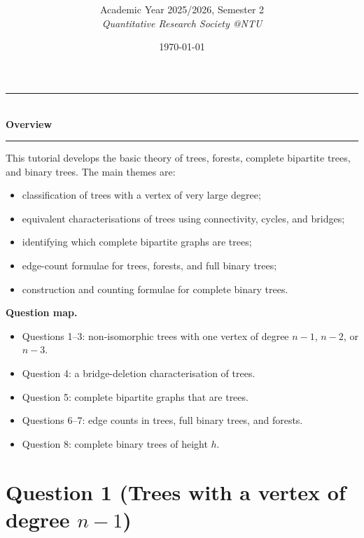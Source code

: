 \documentclass[12pt]{article}
\title{
\CourseCode\ \CourseName \\[0.3em]
\large \DocType
}
\author{
  Academic Year 2025/2026, Semester 2 \\[0.25em]
  \textit{Quantitative Research Society @NTU}
}
\date{\today}
\begin{document}
\maketitle
\thispagestyle{plainfirst}
\pagestyle{main}

\begin{center}
  \rule{0.82\textwidth}{0.4pt}\\[4pt]
  \textbf{Overview}\\[2pt]
  \rule{0.82\textwidth}{0.4pt}
\end{center}

\noindent
This tutorial develops the basic theory of trees, forests, complete bipartite trees, and binary trees. The main themes are:
\begin{itemize}[leftmargin=*]
  \item classification of trees with a vertex of very large degree;
  \item equivalent characterisations of trees using connectivity, cycles, and bridges;
  \item identifying which complete bipartite graphs are trees;
  \item edge-count formulae for trees, forests, and full binary trees;
  \item construction and counting formulae for complete binary trees.
\end{itemize}

\noindent
\textbf{Question map.}
\begin{itemize}[leftmargin=*]
  \item Questions 1--3: non-isomorphic trees with one vertex of degree $n-1$, $n-2$, or $n-3$.
  \item Question 4: a bridge-deletion characterisation of trees.
  \item Question 5: complete bipartite graphs that are trees.
  \item Questions 6--7: edge counts in trees, full binary trees, and forests.
  \item Question 8: complete binary trees of height $h$.
\end{itemize}

\newpage
\tableofcontents

\newpage
\section{Question 1 (Trees with a vertex of degree $n-1$)}
\end{document}
